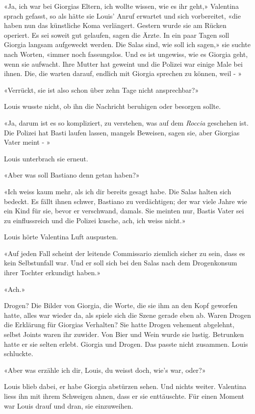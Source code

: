 \sectionbreak

«Ja, ich war bei Giorgias Eltern, ich wollte wissen, wie es ihr geht,»
Valentina sprach gefasst, so als hätte sie Louis’ Anruf erwartet
und sich vorbereitet, «die haben nun das künstliche Koma verlängert. Gestern wurde sie am Rücken operiert. Es sei soweit gut gelaufen, sagen
die Ärzte. In ein paar Tagen soll Giorgia langsam aufgeweckt werden. Die
Salas sind, wie soll ich sagen,» sie suchte nach Worten, «immer noch
fassungslos. Und es ist ungewiss, wie es Giorgia geht, wenn sie
aufwacht. Ihre Mutter hat geweint und die Polizei war einige Male bei
ihnen. Die, die warten darauf, endlich mit Giorgia sprechen zu können,
weil - »

«Verrückt, sie ist also schon über zehn Tage nicht ansprechbar?»

Louis wusste nicht, ob ihn die Nachricht beruhigen oder besorgen sollte.

«Ja, darum ist es so kompliziert, zu verstehen, was auf dem
\emph{Roccia} geschehen ist. Die Polizei hat Basti laufen lassen,
mangels Beweisen, sagen sie, aber Giorgias Vater meint - »

Louis unterbrach sie erneut.

«Aber was soll Bastiano denn getan haben?»

«Ich weiss kaum mehr, als ich dir bereits gesagt habe. Die Salas halten
sich bedeckt. Es fällt ihnen schwer, Bastiano zu verdächtigen; der war
viele Jahre wie ein Kind für sie, bevor er verschwand, damals. Sie
meinten nur, Bastis Vater sei zu einflussreich und die Polizei kusche,
ach, ich weiss nicht.»

Louis hörte Valentina Luft auspusten.

«Auf jeden Fall scheint der leitende Commissario ziemlich sicher zu
sein, dass es kein Selbstunfall war. Und er soll sich bei den Salas nach
dem Drogenkonsum ihrer Tochter erkundigt haben.»

«Ach.»

Drogen? Die Bilder von Giorgia, die Worte, die sie ihm an den Kopf
geworfen hatte, alles war wieder da, als spiele sich die Szene gerade
eben ab. Waren Drogen die Erklärung für Giorgias Verhalten? Sie hatte
Drogen vehement abgelehnt, selbst Joints waren ihr zuwider. Von Bier und
Wein wurde sie lustig. Betrunken hatte er sie selten erlebt. Giorgia und
Drogen. Das passte nicht zusammen. Louis schluckte.

«Aber was erzähle ich dir, Louis, du weisst doch, wie’s war, oder?»

Louis blieb dabei, er habe Giorgia abstürzen sehen. Und nichts weiter.
Valentina liess ihn mit ihrem Schweigen ahnen, dass er sie enttäuschte.
Für einen Moment war Louis drauf und dran, sie einzuweihen.

